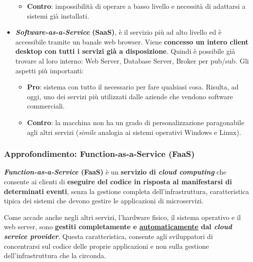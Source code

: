 \documentclass[a4paper]{article}
\begin{document}
\begin{itemize}
\begin{itemize}
			\item \textbf{Contro}: impossibilità di operare a basso livello e necessità di adattarsi a sistemi già installati.
		\end{itemize}
		
		\item \textcolor{Red3}{\textbf{\emph{Software-as-a-Service} (SaaS)}}, è il servizio più ad alto livello ed è accessibile tramite un banale web browser. Viene \textbf{concesso un intero client desktop con tutti i servizi già a disposizione}. Quindi è possibile già trovare al loro interno: Web Server, Database Server, Broker per pub/sub. Gli aspetti più importanti:
		\begin{itemize}
			\item \textbf{Pro}: sistema con tutto il necessario per fare qualsiasi cosa. Risulta, ad oggi, uno dei servizi più utilizzati dalle aziende che vendono software commerciali.
			
			\item \textbf{Contro}: la macchina non ha un grado di personalizzazione paragonabile agli altri servizi (\emph{simile} analogia ai sistemi operativi Windows e Linux).
		\end{itemize}
	\end{itemize}\newpage
	
	\subsubsection{Approfondimento: Function-as-a-Service (FaaS)}
	
	\textcolor{Red3}{\textbf{\emph{Function-as-a-Service} (FaaS)}} è un \textbf{servizio di \emph{cloud computing}} che consente ai clienti di \textbf{eseguire del codice in risposta al manifestarsi di determinati eventi}, senza la gestione completa dell'infrastruttura, caratteristica tipica dei sistemi che devono gestire le applicazioni di microservizi.\newline
	
	\noindent
	Come accade anche negli altri servizi, l'hardware fisico, il sistema operativo e il web server, sono \textbf{gestiti completamente e \underline{automaticamente} dal \emph{cloud service provider}}. Questa caratteristica, consente agli sviluppatori di concentrarsi sul codice delle proprie applicazioni e non sulla gestione dell'infrastruttura che la circonda.\newline
	
\end{document}
